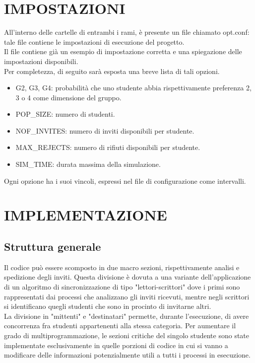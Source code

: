 \documentclass[a4paper,11pt]{article}
\newcommand{\cambiaFont}[2]{{\fontencoding{T1}\fontfamily{#1}%
\selectfont#2}}
\begin{document}
\section{IMPOSTAZIONI}

All’interno delle cartelle di entrambi i rami, è presente un file chiamato \cambiaFont{pcr}{opt.conf}: tale file contiene le impostazioni di esecuzione del progetto. \\Il file contiene già un esempio di impostazione corretta e una spiegazione delle impostazioni disponibili. \\
Per completezza, di seguito sarà esposta una breve lista di tali opzioni.
\begin{itemize}
\item \cambiaFont{pcr}{G2, G3, G4:} probabilità che uno studente abbia rispettivamente preferenza 2, 3 o 4 come dimensione del gruppo.
\item \cambiaFont{pcr}{POP\_SIZE:} numero di studenti.
\item \cambiaFont{pcr}{NOF\_INVITES:} numero di inviti disponibili per studente.
\item \cambiaFont{pcr}{MAX\_REJECTS:} numero di rifiuti disponibili per studente.
\item \cambiaFont{pcr}{SIM\_TIME:} durata massima della simulazione.
\end{itemize}
Ogni opzione ha i suoi vincoli, espressi nel file di configurazione come intervalli.


\section{IMPLEMENTAZIONE}

\subsection{Struttura generale}
Il codice può essere scomposto in due macro sezioni, rispettivamente analisi e
spedizione degli inviti. Questa divisione è dovuta a una variante dell’applicazione di un algoritmo di sincronizzazione di tipo "lettori-scrittori" dove i primi sono rappresentati dai processi che analizzano gli inviti ricevuti, mentre negli scrittori si identificano quegli studenti che sono in procinto di invitarne altri. \\
La divisione in "mittenti" e "destinatari" permette, durante l’esecuzione, di avere
concorrenza fra studenti appartenenti alla stessa categoria. Per aumentare il grado di
multiprogrammazione, le sezioni critiche del singolo studente sono state implementate esclusivamente in quelle porzioni di codice in cui si vanno a modificare delle informazioni potenzialmente utili a tutti i processi in esecuzione.
\end{document}

